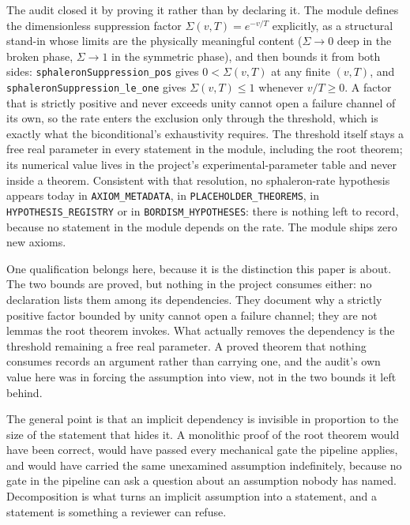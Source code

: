 \documentclass[11pt]{article}
\begin{document}
The audit closed it by proving it rather than by declaring it. The
module defines the dimensionless suppression factor
$\Sigma(v,T) = e^{-v/T}$ explicitly, as a structural stand-in whose
limits are the physically meaningful content ($\Sigma \to 0$ deep in
the broken phase, $\Sigma \to 1$ in the symmetric phase), and then
bounds it from both sides:
\texttt{sphaleronSuppression\_pos} gives $0 < \Sigma(v,T)$ at any
finite $(v,T)$, and
\texttt{sphaleronSuppression\_le\_one} gives $\Sigma(v,T) \leq 1$
whenever $v/T \geq 0$. A factor that is strictly positive and never
exceeds unity cannot open a failure channel of its own, so the rate
enters the exclusion only through the threshold, which is exactly what
the biconditional's exhaustivity requires. The threshold itself stays a
free real parameter in every statement in the module, including the
root theorem; its numerical value lives in the project's
experimental-parameter table and never inside a theorem. Consistent
with that resolution, no sphaleron-rate hypothesis appears today in
\texttt{AXIOM\_METADATA}, in \texttt{PLACEHOLDER\_THEOREMS}, in
\texttt{HYPOTHESIS\_REGISTRY} or in \texttt{BORDISM\_HYPOTHESES}: there
is nothing left to record, because no statement in the module depends
on the rate. The module ships zero new axioms.

One qualification belongs here, because it is the distinction this
paper is about. The two bounds are proved, but nothing in the project
consumes either: no declaration lists them among its dependencies.
They document why a strictly positive factor bounded by unity cannot
open a failure channel; they are not lemmas the root theorem invokes.
What actually removes the dependency is the threshold remaining a free
real parameter. A proved theorem that nothing consumes records an
argument rather than carrying one, and the audit's own value here was
in forcing the assumption into view, not in the two bounds it left
behind.

The general point is that an implicit dependency is invisible in
proportion to the size of the statement that hides it. A monolithic
proof of the root theorem would have been correct, would have passed
every mechanical gate the pipeline applies, and would have carried the
same unexamined assumption indefinitely, because no gate in the pipeline
can ask a question about an assumption nobody has named. Decomposition
is what turns an implicit assumption into a statement, and a statement
is something a reviewer can refuse.
\end{document}
